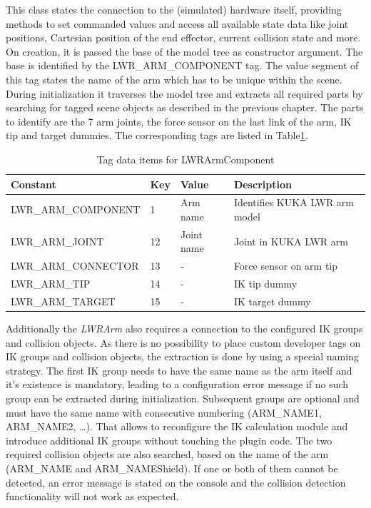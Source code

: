 This class states the connection to the (simulated) hardware itself, providing methods to set commanded values and access all available state data like joint positions, Cartesian position of the end effector, current collision state and more. On creation, it is passed the base of the model tree as constructor argument. The base is identified by the LWR\_ARM\_COMPONENT tag. The value segment of this tag states the name of the arm which has to be unique within the scene. During initialization it traverses the model tree and extracts all required parts by searching for tagged scene objects as described in the previous chapter. The parts to identify are the 7 arm joints, the force sensor on the last link of the arm, IK tip and target dummies. The corresponding tags are listed in Table\ref{fig:lwr_tags}.
\begin{table}[ht]
  \centering
  \label{fig:lwr_tags}
  \begin{tabularx}{\textwidth}{|l|l|l|X|} \hline
	\textbf{Constant} & \textbf{Key} & \textbf{Value} & \textbf{Description} \\ \hline
	LWR\_ARM\_COMPONENT & 1 & Arm name & Identifies KUKA LWR arm model \\
	LWR\_ARM\_JOINT & 12 & Joint name & Joint in KUKA LWR arm \\
	LWR\_ARM\_CONNECTOR & 13 & - & Force sensor on arm tip \\
	LWR\_ARM\_TIP & 14 & - & IK tip dummy \\
	LWR\_ARM\_TARGET & 15 & - & IK target dummy  \\ \hline
  \end{tabularx}
  \caption{Tag data items for LWRArmComponent}
\end{table}
Additionally the \emph{LWRArm} also requires a connection to the configured IK groups and collision objects. As there is no possibility to place custom developer tags on IK groups and collision objects, the extraction is done by using a special naming strategy. The first IK group needs to have the same name as the arm itself and it's existence is mandatory, leading to a configuration error message if no such group can be extracted during initialization. Subsequent groups are optional and must have the same name with consecutive numbering (ARM\_NAME1, ARM\_NAME2, \ldots). That allows to reconfigure the IK calculation module and introduce additional IK groups without touching the plugin code. The two required collision objects are also searched, based on the name of the arm (ARM\_NAME and ARM\_NAMEShield). If one or both of them cannot be detected, an error message is stated on the console and the collision detection functionality will not work as expected.

